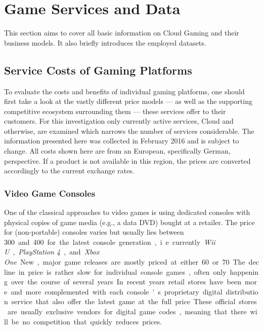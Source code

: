 \section{Game Services and Data}
\label{sec:background}

This section aims to cover all basic information on Cloud Gaming and their business models. It also briefly introduces the employed datasets.

\subsection{Service Costs of Gaming Platforms}

To evaluate the costs and benefits of individual gaming platforms, one should first take a look at the vastly different price models --- as well as the supporting competitive ecosystem surrounding them --- these services offer to their customers. For this investigation only currently active services, Cloud and otherwise, are examined which narrows the number of services considerable. The information presented here was collected in February 2016 and is subject to change. All costs shown here are from an European, specifically German, perspective. If a product is not available in this region, the prices are converted accordingly to the current exchange rates.


\subsubsection{Video Game Consoles}

One of the classical approaches to video games is using dedicated consoles with physical copies of game media (e.g., a data DVD) bought at a retailer. The price for (non-portable) consoles varies but usually lies between \SI{300}[\EUR] and \SI{400}[\EUR] for the latest console generation, i.e. currently \textit{Wii U}, \textit{PlayStation 4}, and \textit{Xbox One}. New, major game releases are mostly priced at either \SI{60}[\EUR] or \SI{70}[\EUR]. The decline in price is rather slow for individual console games, often only happening over the course of several years.

In recent years retail stores have been more and more complemented with each console's proprietary digital distribution service that also offer the latest game at the full price. These official stores are usually exclusive vendors for digital game codes, meaning that there will be no competition that quickly reduces prices.

